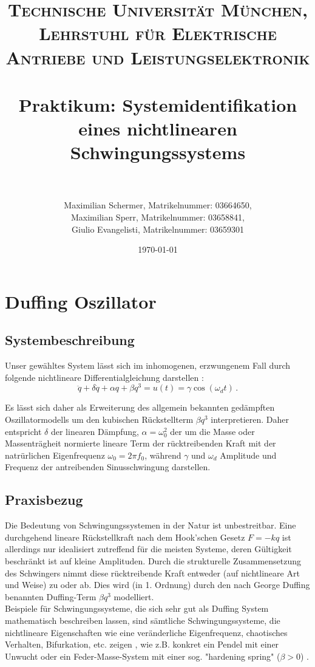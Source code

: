 \documentclass[paper=a4, fontsize=11pt]{scrartcl} %
\title{	
\normalfont \normalsize 
\textsc{Technische Universität München, Lehrstuhl für Elektrische Antriebe und Leistungselektronik} \\ [25pt] %
\horrule{0.5pt} \\[0.4cm] %
\huge Praktikum: Systemidentifikation eines nichtlinearen Schwingungssystems \\ %
\horrule{2pt} \\[0.5cm] %
}
\author{Maximilian Schermer, Matrikelnummer: 03664650, \\ Maximilian Sperr, Matrikelnummer: 03658841,\\ Giulio Evangelisti,  Matrikelnummer: 03659301} %
\date{\normalsize\today} %
\numberwithin{equation}{section} %
\numberwithin{figure}{section} %
\numberwithin{table}{section} %
\begin{document}
\maketitle %


\section{Duffing Oszillator}

\subsection{Systembeschreibung}

Unser gewähltes System lässt sich im inhomogenen, erzwungenem Fall durch folgende nichtlineare Differentialgleichung darstellen \cite{Duffing}:
\begin{equation}
\ddot{q}+\delta \dot{q}+\alpha q+\beta q^3=u(t)=\gamma \cos(\omega_d t)\, .
\end{equation}

Es lässt sich daher als Erweiterung des allgemein bekannten gedämpften Oszillatormodells um den kubischen Rückstellterm $\beta q^3$ interpretieren. Daher entspricht $\delta$ der linearen Dämpfung, $\alpha=\omega_0^2$ der um die Masse oder Massenträgheit normierte lineare Term der rücktreibenden Kraft mit der natrürlichen Eigenfrequenz $\omega_0=2\pi f_0$, während $\gamma$ und $\omega_d$ Amplitude und Frequenz der antreibenden Sinusschwingung darstellen.

\subsection{Praxisbezug}

Die Bedeutung von Schwingungssystemen in der Natur ist unbestreitbar. Eine durchgehend lineare Rückstellkraft nach dem Hook'schen Gesetz $F=-kq$ ist allerdings nur idealisiert zutreffend für die meisten Systeme, deren Gültigkeit beschränkt ist auf kleine Amplituden. Durch die strukturelle Zusammensetzung des Schwingers nimmt diese rücktreibende Kraft entweder (auf nichtlineare Art und Weise) zu oder ab. Dies wird (in 1. Ordnung) durch den nach George Duffing benannten Duffing-Term $\beta q^3$ modelliert.\\
Beispiele für Schwingungssysteme, die sich sehr gut als Duffing System mathematisch beschreiben lassen, sind sämtliche Schwingungssysteme, die nichtlineare Eigenschaften wie eine veränderliche Eigenfrequenz, chaotisches Verhalten, Bifurkation, etc. zeigen \cite{Duffing}, wie z.B. konkret ein Pendel mit einer Unwucht oder ein Feder-Masse-System mit einer sog. "hardening spring" ($\beta>0$) \cite{Khalil}.
\end{document}
